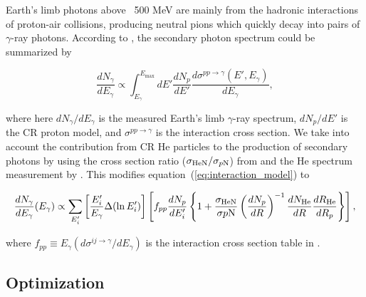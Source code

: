 Earth's limb photons above ~500 MeV are mainly from the hadronic
interactions of proton-air collisions, producing neutral pions
which quickly decay into pairs of $\gamma$-ray photons. According to \cite{K&Omodel},
the secondary photon spectrum could be summarized by

\begin{equation}
    \frac{dN_\gamma}{dE_\gamma}\propto \int^{E_{\text{max}}}_{E_\gamma} dE'\frac{dN_p}{dE'} \frac{d\sigma^{pp\rightarrow\gamma}(E',E_\gamma)}{dE_\gamma}
    ,\label{eq:interaction_model}
\end{equation}

where here $dN_\gamma/dE_\gamma$ is the measured Earth's limb $\gamma$-ray spectrum,
$dN_p/dE'$ is the CR proton model, and $\sigma^{pp\rightarrow\gamma}$ is the interaction
cross section.
We take into account the contribution from CR He particles to the production of secondary
photons by using the cross section ratio ($\sigma_{\rm HeN}/\sigma_{p\rm N}$) from
\cite{WAtwater} and the He spectrum measurement by \cite{AMS-02Helium}. This modifies
equation~(\ref{eq:interaction_model}) to

\begin{equation}
    \frac{dN_{\gamma}}{dE_\gamma}(E_\gamma) \propto
    \sum_{E'_i}\left[\frac{E'_i}{E_{\gamma}}\Delta(\ln E'_i) \right]
    \left[ 
        f_{pp}\frac{dN_p}{dE'_i}
        \left\{
            1+\frac{\sigma_{\text{HeN}}}{\sigma{p\rm N}}\left(\frac{dN_p}{dR}\right)^{-1} \frac{dN_{\text{He}}}{dR} \frac{dR_{\text{He}}}{dR_p} 
        \right\}
    \right]
    ,\label{eq:derived_model}
\end{equation}

where $f_{pp} \equiv E_\gamma(d\sigma^{ij\rightarrow\gamma}/dE_\gamma)$
is the interaction cross section table in \cite{K&Omodel}.

\subsection{Optimization}

